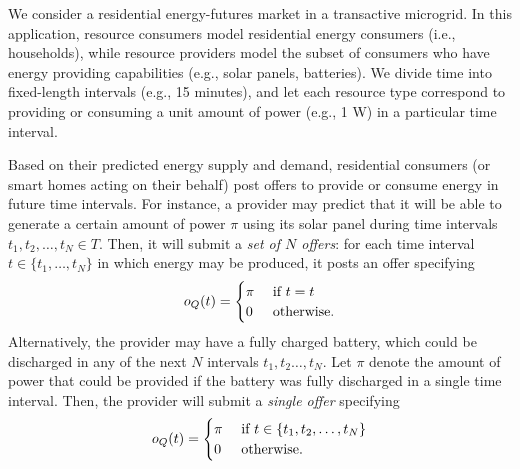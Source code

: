\newcommand{\etime}[0]{\ensuremath{t}}

We consider a residential energy-futures market in a transactive microgrid.
In this application, resource consumers model residential energy consumers (i.e., households), while resource providers model the subset of consumers who have energy providing capabilities (e.g., solar panels, batteries).
We divide time into fixed-length intervals (e.g., 15 minutes),
 and let each resource type correspond to providing or consuming a unit amount of power (e.g., 1 W) in a particular time interval.

Based on their predicted energy supply and demand, residential consumers (or smart homes acting on their behalf) post offers to provide or consume energy in future time intervals.
For instance, a provider may predict that it will be able to generate a certain amount of power $\pi$ using its solar panel during time intervals $\etime_1, \etime_2, \ldots, \etime_N \in T$.
Then, it will submit a \emph{set of $N$ offers}: for each time interval~$\etime \in \{\etime_1, \ldots, \etime_N\}$ in which energy may be produced, it posts an offer specifying %
\begin{equation}
    o_Q(t) = \begin{cases}
    \pi & \textnormal{ if } t = \etime \\
    0 & \textnormal{ otherwise.}
    \end{cases}
\end{equation}
Alternatively, the provider may have a fully charged battery, which could be discharged in any of the next $N$ intervals $\etime_1, \etime_2 \ldots, \etime_N$.
Let $\pi$ denote the amount of power that could be provided if the battery was fully discharged in a single time interval.
Then, the provider will submit a \emph{single offer} specifying
\begin{equation}
    o_Q(t) = \begin{cases}
    \pi & \textnormal{ if } t \in \left\{ \etime_1, \etime_2, \ldots, \etime_N \right\} \\
    0 & \textnormal{ otherwise.}
    \end{cases}
\end{equation}

